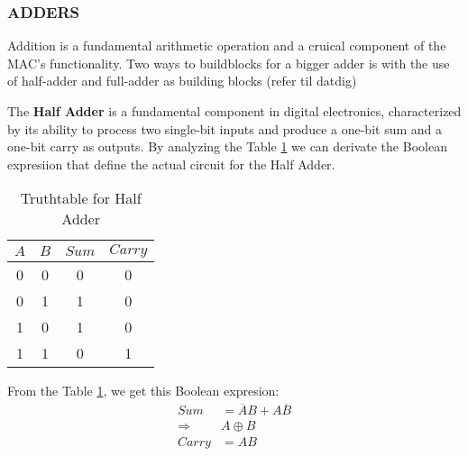 
\subsubsection{ADDERS}
Addition is a fundamental arithmetic operation and a cruical component of the MAC's functionality. Two ways to buildblocks for a bigger adder is with the use of half-adder and full-adder as building blocks (refer til datdig)


The \textbf{Half Adder} is a fundamental component in digital electronics, characterized by its ability to process two single-bit inputs and produce a one-bit sum and a one-bit carry as outputs. By analyzing the Table \ref{Truthtable for Half Adder} we can derivate the Boolean expresiion that define the actual circuit for the Half Adder.


\begin{table}[H]
    \centering
    \caption{Truthtable for Half Adder}\label{Truthtable for Half Adder}                 
    \begin{tabular}{|c|c|c|c|}
        \hline
        \(A\) & \(B\) & \(Sum\) & \(Carry\) \\
        \hline
        0 & 0 & 0 & 0 \\
        0 & 1 & 1 & 0 \\
        1 & 0 & 1 & 0 \\
        1 & 1 & 0 & 1 \\
        \hline
        
    \end{tabular}
\end{table}

From the Table \ref{Truthtable for Half Adder},  we get this Boolean expresion:
\begin{equation}
    \begin{aligned}
        Sum&=\overline{A}B+A\overline{B}\\
        \Rightarrow&A\oplus B\\
        Carry&=AB\\ 
    \end{aligned}
\end{equation}




